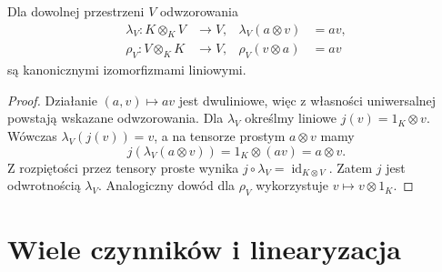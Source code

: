 \begin{twierdzenie}
\label{thm:lin10-jednostka}
Dla dowolnej przestrzeni \(V\)
odwzorowania
\[
 \begin{aligned}
 \lambda_V\colon K\otimes_KV&\to V,
 &\lambda_V(a\otimes v)&=av,\\
 \rho_V\colon V\otimes_KK&\to V,
 &\rho_V(v\otimes a)&=av
 \end{aligned}
\]
są kanonicznymi izomorfizmami liniowymi.
\end{twierdzenie}
\begin{proof}
Działanie \((a,v)\mapsto av\)
jest dwuliniowe, więc
z własności uniwersalnej
powstają wskazane odwzorowania.
Dla \(\lambda_V\) określmy
liniowe \(j(v)=1_K\otimes v\).
Wówczas \(\lambda_V(j(v))=v\),
a na tensorze prostym
\(a\otimes v\) mamy
\[
 j(\lambda_V(a\otimes v))
 =1_K\otimes(av)
 =a\otimes v.
\]
Z rozpiętości przez tensory proste
wynika \(j\circ\lambda_V
=\operatorname{id}_{K\otimes V}\).
Zatem \(j\) jest odwrotnością
\(\lambda_V\).
Analogiczny dowód dla \(\rho_V\)
wykorzystuje \(v\mapsto v\otimes1_K\).
\end{proof}

\section{Wiele czynników i linearyzacja}
\label{sec:lin10-wielokrotne}

